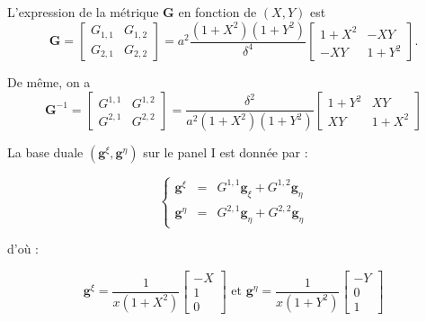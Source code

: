 L'expression de la métrique $\mathbf{G}$ en fonction de $(X,Y)$ est
\begin{equation}
\mathbf{G} = \begin{bmatrix}
G_{1,1} & G_{1,2} \\ G_{2,1} & G_{2,2}
\end{bmatrix} 
= a^2 \dfrac{(1+X^2)(1+Y^2)}{\delta^4} \begin{bmatrix}
1+X^2 & -XY \\ -XY & 1+Y^2
\end{bmatrix} .
\end{equation}

De même, on a
\begin{equation}
\mathbf{G}^{-1} = \begin{bmatrix}
G^{1,1} & G^{1,2} \\ G^{2,1} & G^{2,2}
\end{bmatrix} = \dfrac{\delta^2}{a^2 (1+X^2)(1+Y^2)} \begin{bmatrix}
1+Y^2 & XY \\ XY & 1+X^2
\end{bmatrix}
\label{eq: metrique inverse}
\end{equation}

La base duale $(\mathbf{g}^{\xi}, \mathbf{g}^{\eta})$ sur le panel I est donnée par :

\begin{equation}
\left\lbrace
\begin{array}{rcl}
\mathbf{g}^{\xi} & = & G^{1,1} \mathbf{g}_{\xi} + G^{1,2} \mathbf{g}_{\eta} \\
\mathbf{g}^{\eta} & = & G^{2,1} \mathbf{g}_{\eta} + G^{2,2} \mathbf{g}_{\eta}
\end{array}
\right.
\end{equation}

d'où :

\begin{equation}
\mathbf{g}^{\xi} = \dfrac{1}{x(1+X^2)}\begin{bmatrix}
-X \\ 1 \\ 0
\end{bmatrix} \text{ et } \mathbf{g}^{\eta} = \dfrac{1}{x(1+Y^2)}\begin{bmatrix}
-Y \\ 0 \\ 1
\end{bmatrix}
\label{eq: base duale I}
\end{equation}



